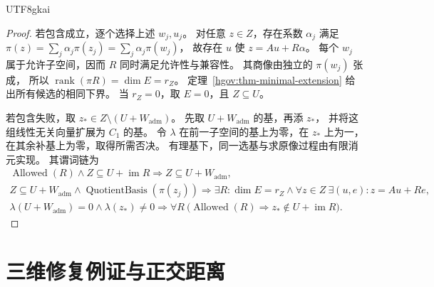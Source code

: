 \documentclass[12pt,a4paper,openany,notitlepage]{report}
\theoremstyle{plain}
\theoremstyle{definition}
\theoremstyle{remark}
\begin{document}
\begin{CJK*}{UTF8}{gkai}
\begin{proof}
若包含成立，逐个选择上述 $w_j,u_j$。
对任意 $z\in Z$，存在系数 $\alpha_j$ 满足
$\pi(z)=\sum_j\alpha_j\pi(z_j)=\sum_j\alpha_j\pi(w_j)$，
故存在 $u$ 使 $z=Au+R\alpha$。
每个 $w_j$ 属于允许子空间，因而 $R$ 同时满足允许性与兼容性。
其商像由独立的 $\pi(w_j)$ 张成，
所以 $\operatorname{rank}(\pi R)=\dim E=r_Z$。
定理~\ref{hgov:thm-minimal-extension} 给出所有候选的相同下界。
当 $r_Z=0$，取 $E=0$，且 $Z\subseteq U$。

若包含失败，取 $z_*\in Z\setminus(U+W_{\mathrm{adm}})$。
先取 $U+W_{\mathrm{adm}}$ 的基，再添 $z_*$，
并将这组线性无关向量扩展为 $C_1$ 的基。
令 $\lambda$ 在前一子空间的基上为零，在 $z_*$ 上为一，
在其余补基上为零，取得所需否决。
有理基下，同一选基与求原像过程由有限消元实现。
其谓词链为
\[
 \begin{gathered}
 \operatorname{Allowed}(R)\land
 Z\subseteq U+\operatorname{im}R
 \Rightarrow Z\subseteq U+W_{\mathrm{adm}},\\
 Z\subseteq U+W_{\mathrm{adm}}
 \land\operatorname{QuotientBasis}(\pi(z_j))
 \Rightarrow\exists R:\dim E=r_Z
 \land\forall z\in Z\ \exists(u,e):z=Au+Re,\\
 \lambda(U+W_{\mathrm{adm}})=0\land\lambda(z_*)\ne0
 \Rightarrow
 \forall R\ \bigl(\operatorname{Allowed}(R)
       \Rightarrow z_*\notin U+\operatorname{im}R\bigr).
 \end{gathered}
\]
\end{proof}

\section{三维修复例证与正交距离}
\label{hgov:three-dimensional}


\end{CJK*}
\end{document}
